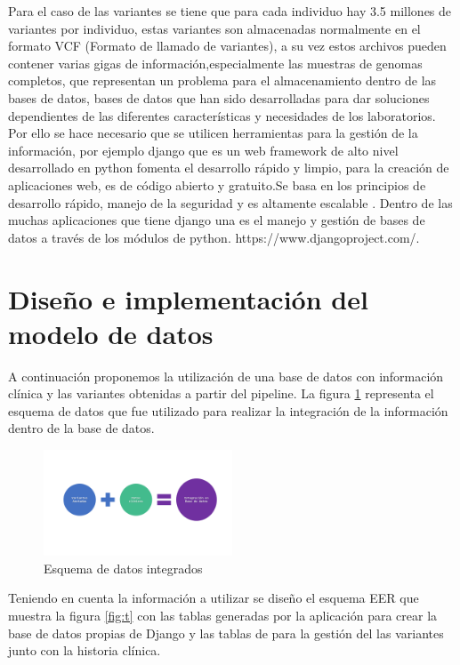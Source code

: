 Para el caso de las variantes se tiene que para cada individuo hay 3.5 millones de variantes por individuo, estas variantes son almacenadas normalmente en el formato VCF (Formato de llamado de variantes), a su vez estos archivos pueden contener varias gigas de información,especialmente las muestras de genomas completos, que representan un problema para el almacenamiento dentro de las bases de datos, bases de datos que han sido desarrolladas para dar soluciones dependientes de las diferentes características y necesidades de los laboratorios\cite{Kutzera2017}.\\

Por ello se hace necesario que se utilicen herramientas para la gestión de la información, por ejemplo django que es un web framework de alto nivel desarrollado en python  fomenta el desarrollo rápido y limpio, para la creación de aplicaciones web, es de código abierto y gratuito.Se basa en los principios de desarrollo rápido, manejo de la seguridad y es altamente escalable . Dentro de las muchas aplicaciones que tiene django una es el manejo y gestión de bases de datos a través de los módulos de python. https://www.djangoproject.com/. 

\section{Diseño e implementación del modelo de datos}

A continuación proponemos la utilización de una base de datos con información clínica  y las variantes obtenidas a partir del pipeline. La figura \ref{fig:flujo2} representa el esquema de datos que fue utilizado para realizar la integración de la información dentro de la base de datos.

\begin{figure}[H] 
	\centering
	\includegraphics[width=0.5\textwidth]{Kap3/flujo2}
	\caption{Esquema de datos integrados} 
	\label{fig:flujo2}
\end{figure}

Teniendo en cuenta la información a utilizar se diseño el esquema EER  que muestra la figura \ref{fig:t} con las tablas generadas por la aplicación para crear la base de datos propias de Django y las tablas de para la gestión del las variantes junto con la historia clínica.


